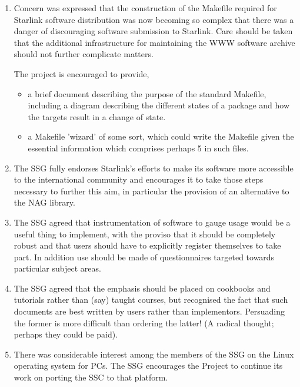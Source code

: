 \begin{enumerate}

\item Concern was expressed that the construction of the Makefile required
for Starlink software distribution was now becoming so complex that
there was a danger of discouraging software submission to Starlink.
Care should be taken that the additional infrastructure for
maintaining the WWW software archive should not further complicate
matters.

The project is encouraged to provide,

\begin{itemize}
\item a brief document describing the purpose of the standard Makefile,
including a diagram describing the different states of a package and
how the targets result in a change of state.

\item a Makefile 'wizard' of some sort, which could write the Makefile
given the essential information which comprises perhaps 5%
in such files.
\end{itemize}

\item \label{infoSSG:NAG}The SSG fully endorses Starlink's efforts to
make its software more accessible to the international community and
encourages it to take those steps necessary to further this aim, in
particular the provision of an alternative to the NAG library.

\item The SSG agreed that instrumentation of software to gauge usage would
be a useful thing to implement, with the proviso that it should be
completely robust and that users should have to explicitly register
themselves to take part. In addition use should be made of
questionnaires targeted towards particular subject areas.

\item \label{infoSSG:cookbook}The SSG agreed that the emphasis should
be placed on cookbooks and tutorials rather than (say) taught courses,
but recognised the fact that such documents are best written by users
rather than implementors.  Persuading the former is more difficult
than ordering the latter!  (A radical thought; perhaps they could be
paid).

\item \label{infoSSG:PC}There was considerable interest among the
members of the SSG on the Linux operating system for PCs. The SSG
encourages the Project to continue its work on porting the SSC to that
platform.


\end{enumerate}
